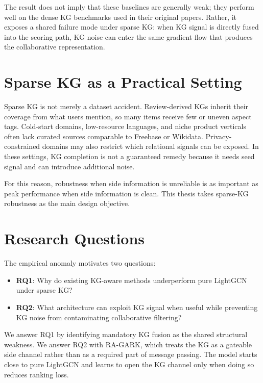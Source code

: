 The result does not imply that these baselines are generally weak; they perform well on the dense KG benchmarks used in their original papers. Rather, it exposes a shared failure mode under sparse KG: when KG signal is directly fused into the scoring path, KG noise can enter the same gradient flow that produces the collaborative representation.

\section{Sparse KG as a Practical Setting}
\label{sec:intro-sparse-kg}

Sparse KG is not merely a dataset accident. Review-derived KGs inherit their coverage from what users mention, so many items receive few or uneven aspect tags. Cold-start domains, low-resource languages, and niche product verticals often lack curated sources comparable to Freebase or Wikidata. Privacy-constrained domains may also restrict which relational signals can be exposed. In these settings, KG completion is not a guaranteed remedy because it needs seed signal and can introduce additional noise.

For this reason, robustness when side information is unreliable is as important as peak performance when side information is clean. This thesis takes sparse-KG robustness as the main design objective.

\section{Research Questions}
\label{sec:intro-rq}

The empirical anomaly motivates two questions:

\begin{itemize}
  \item \textbf{RQ1}: Why do existing KG-aware methods underperform pure LightGCN under sparse KG?
  \item \textbf{RQ2}: What architecture can exploit KG signal when useful while preventing KG noise from contaminating collaborative filtering?
\end{itemize}

We answer RQ1 by identifying mandatory KG fusion as the shared structural weakness. We answer RQ2 with RA-GARK, which treats the KG as a gateable side channel rather than as a required part of message passing. The model starts close to pure LightGCN and learns to open the KG channel only when doing so reduces ranking loss.

